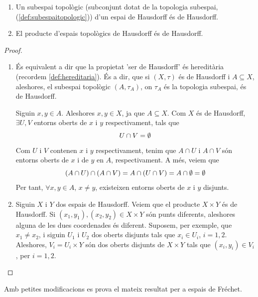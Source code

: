 \documentclass[../main.tex]{subfiles}
\begin{document}
\begin{prop}
\label{prop:hausdorff2} 
\begin{enumerate}[(1)]
    \item Un subespai topològic (subconjunt dotat de la topologia subespai, (\ref{def:subespaitopologic})) d'un espai de Hausdorff és de Hausdorff.
    \item El producte d'espais topològics de Hausdorff és de Hausdorff.
\end{enumerate}
\end{prop}
\begin{proof}
\begin{enumerate}[(1)]
    \item És equivalent a dir que la propietat 'ser de Hausdorff' és hereditària (recordem \ref{def:hereditaria}). És a dir, que si $(X,\tau)$ és de Hausdorff i $A\subseteq X$, aleshores, el subespai topològic $(A,\tau_A)$, on $\tau_A$ és la topologia subespai, és de Hausdorff.
    
    Siguin $x,y\in A$. Aleshores $x,y\in X$, ja que $A\subseteq X$. Com $X$ és de Hausdorff, $\exists U,V$ entorns oberts de $x$ i $y$ respectivament, tals que
    \begin{equation}
        \notag
        U\cap V = \emptyset
    \end{equation}
    Com $U$ i $V$ contenen $x$ i $y$ respectivament, tenim que $A\cap U$ i $A\cap V$ són entorns oberts de $x$ i de $y$ en $A$, respectivament. A més, veiem que 
    \begin{equation}
        \notag
        (A\cap U)\cap(A\cap V) = A\cap(U\cap V) = A\cap\emptyset = \emptyset
    \end{equation}
    Per tant, $\forall x,y\in A$, $x\not=y$, existeixen entorns oberts de $x$ i $y$ disjunts.
    
    \item Siguin $X$ i $Y$ dos espais de Hausdorff. Veiem que el producte $X\times Y$ és de Hausdorff. Si $(x_1,y_1),(x_2,y_2)\in X\times Y$ són punts diferents, aleshores alguna de les dues coordenades és diferent. Suposem, per exemple, que $x_1\not=x_2$, i siguin $U_1$ i $U_2$ dos oberts disjunts tals que $x_i\in U_i$, $i=1,2$. Aleshores, $V_i = U_i\times Y$ són dos oberts disjunts de $X\times Y$ tals que $(x_i,y_i)\in V_i$, per $i=1,2$.
\end{enumerate}
\end{proof}
Amb petites modificacions es prova el mateix resultat per a espais de Fréchet.
\end{document}
